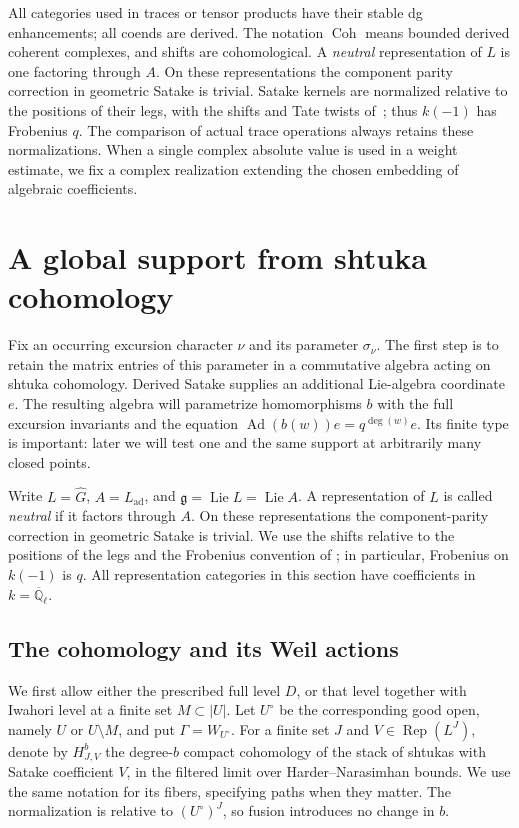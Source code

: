 \documentclass[11pt]{article}
\numberwithin{equation}{section}
\theoremstyle{definition}
\theoremstyle{remark}
\newcommand{\Q}{\mathbb Q}
\newcommand{\Gd}{\widehat G}
\newcommand{\g}{\mathfrak g}
\newcommand{\Ad}{\operatorname{Ad}}
\newcommand{\Lie}{\operatorname{Lie}}
\newcommand{\Rep}{\operatorname{Rep}}
\newcommand{\Coh}{\operatorname{Coh}}
\begin{document}
All categories used in traces or tensor products have their stable
dg enhancements; all coends are derived.  The notation $\Coh$
means bounded derived coherent complexes, and shifts are
cohomological.  A \emph{neutral} representation of $L$ is one
factoring through $A$.  On these representations the component
parity correction in geometric Satake is trivial.  Satake kernels
are normalized relative to the positions of their legs, with the
shifts and Tate twists of~\cite{Parent}; thus $k(-1)$ has Frobenius
$q$.  The comparison of actual trace operations always retains
these normalizations.  When a single complex absolute value is
used in a weight estimate, we fix a complex realization extending
the chosen embedding of algebraic coefficients.


\section{A global support from shtuka cohomology}
\label{sec:global-support}

Fix an occurring excursion character $\nu$ and its parameter $\sigma_\nu$.
The first step is to retain the matrix entries of this parameter in a
commutative algebra acting on shtuka cohomology.  Derived Satake supplies
an additional Lie-algebra coordinate $e$.  The resulting algebra will
parametrize homomorphisms $b$ with the full excursion invariants and
the equation $\Ad(b(w))e=q^{\deg(w)}e$.  Its finite type is important: later we
will test one and the same support at arbitrarily many closed points.

Write $L=\Gd$, $A=L_{\mathrm{ad}}$, and $\g=\Lie L=\Lie A$.
A representation of $L$ is called \emph{neutral} if it factors through
$A$.  On these representations the component-parity correction in
geometric Satake is trivial.  We use the shifts relative to the positions
of the legs and the Frobenius convention of
\cite[Section~2]{Parent}; in particular, Frobenius on $k(-1)$ is $q$.
All representation categories in this section have coefficients in
$k=\overline{\Q}_\ell$.

\subsection{The cohomology and its Weil actions}

We first allow either the prescribed full level $D$, or that level
together with Iwahori level at a finite set $M\subset |U|$.  Let
$U^\circ$ be the corresponding good open, namely $U$ or
$U\setminus M$, and put $\Gamma=W_{U^\circ}$.  For a finite set $J$
and $V\in\Rep(L^J)$, denote by $H^b_{J,V}$ the degree-$b$ compact
cohomology of the stack of shtukas with Satake coefficient $V$, in the
filtered limit over Harder--Narasimhan bounds.  We use the same notation
for its fibers, specifying paths when they matter.  The normalization is
relative to $(U^\circ)^J$, so fusion introduces no change in $b$.
\end{document}
